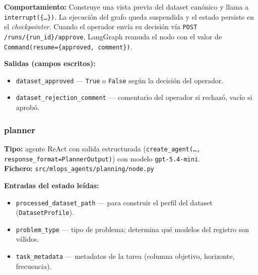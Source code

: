 \textbf{Comportamiento:} Construye una vista previa del dataset canónico y llama a \texttt{interrupt(\{\ldots\})}. La ejecución del grafo queda suspendida y el estado persiste en el \emph{checkpointer}. Cuando el operador envía su decisión vía \texttt{POST /runs/\{run\_id\}/approve}, LangGraph reanuda el nodo con el valor de \texttt{Command(resume=\{approved, comment\})}.

\textbf{Salidas (campos escritos):}
\begin{itemize}
  \item \texttt{dataset\_approved} — \texttt{True} o \texttt{False} según la decisión del operador.
  \item \texttt{dataset\_rejection\_comment} — comentario del operador si rechazó, vacío si aprobó.
\end{itemize}

\subsubsection*{planner}
\label{sec:nodo-planner}

\textbf{Tipo:} agente ReAct con salida estructurada (\texttt{create\_agent(\ldots, response\_format=PlannerOutput)}) con modelo \texttt{gpt-5.4-mini}.\\
\textbf{Fichero:} \texttt{src/mlops\_agents/planning/node.py}

\textbf{Entradas del estado leídas:}
\begin{itemize}
  \item \texttt{processed\_dataset\_path} — para construir el perfil del dataset (\texttt{DatasetProfile}).
  \item \texttt{problem\_type} — tipo de problema; determina qué modelos del registro son válidos.
  \item \texttt{task\_metadata} — metadatos de la tarea (columna objetivo, horizonte, frecuencia).
\end{itemize}

